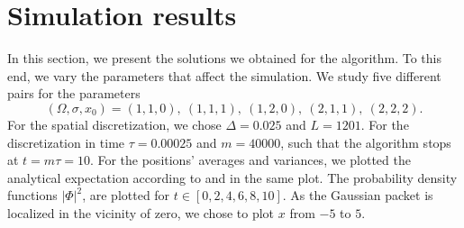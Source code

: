 \section{Simulation results}
In this section, we present the solutions we obtained for the algorithm. To this end, we vary the parameters that affect the simulation. We study five different pairs for the parameters
\begin{equation}
(\Omega, \sigma, x_0) = (1,1,0),\ (1,1,1),\ (1,2,0),\ (2,1,1),\ (2,2,2)	.
\end{equation}
For the spatial discretization, we chose $\Delta = 0.025$ and $L = 1201$. For the discretization in time $\tau = 0.00025$ and $m = 40000$, such that the algorithm stops at $t = m\tau = 10$.
For the positions' averages and variances, we plotted the analytical expectation according to  and  in the same plot.
The probability density functions $|\Phi|^2$, are plotted for $t\in [0,2,4,6,8,10]$. {As the Gaussian packet is localized in the vicinity of zero, we chose to plot $x$ from $-5$ to $5$.}
